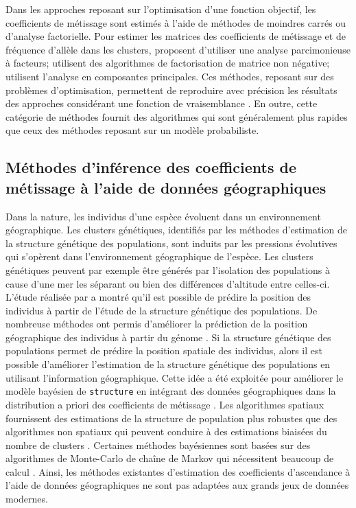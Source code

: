 \documentclass[12pt,a4paper,twoside]{ugathesis}
\begin{document}
Dans les approches reposant sur l'optimisation d'une fonction objectif, les
coefficients de métissage sont estimés à l'aide de méthodes de moindres carrés
ou d'analyse factorielle. Pour estimer les matrices des coefficients de
métissage et de fréquence d'allèle dans les clusters, \citet{Engelhardt_2010}
proposent d'utiliser une analyse parcimonieuse à facteurs; \citet{Frichot_2014}
utilisent des algorithmes de factorisation de matrice non négative;
\citet{Popescu_2014} utilisent l'analyse en composantes principales. Ces méthodes,
reposant sur des problèmes d'optimisation, permettent de reproduire avec
précision les résultats des approches considérant une fonction de vraisemblance
\citep{Frichot_2014}. En outre, cette catégorie de méthodes fournit des
algorithmes qui sont généralement plus rapides que ceux des méthodes reposant
sur un modèle probabiliste.

\subsection{Méthodes d'inférence des coefficients de métissage à l'aide de données géographiques}
\label{sec:org5369fb9}

Dans la nature, les individus d'une espèce évoluent dans un environnement
géographique. Les clusters génétiques, identifiés par les méthodes d'estimation
de la structure génétique des populations, sont induits par les pressions
évolutives qui s'opèrent dans l'environnement géographique de l'espèce. Les
clusters génétiques peuvent par exemple être générés par l'isolation des
populations à cause d'une mer les séparant ou bien des différences d'altitude
entre celles-ci. L'étude réalisée par \citet{Novembre_2008} a montré qu'il est
possible de prédire la position des individus à partir de l'étude de la
structure génétique des populations. De nombreuse méthodes ont permis
d'améliorer la prédiction de la position géographique des individus à partir du
génome \citep{Baran_2013,Yang_2012,Bhaskar_2016,Ra_ola_2014}. Si la structure
génétique des populations permet de prédire la position spatiale des individus,
alors il est possible d'améliorer l'estimation de la structure génétique des
populations en utilisant l'information géographique. Cette idée a été exploitée
pour améliorer le modèle bayésien de \texttt{structure} en intégrant des données
géographiques dans la distribution a priori des coefficients de métissage
\citep{CHEN_2007,Corander2008}. Les algorithmes spatiaux fournissent des
estimations de la structure de population plus robustes que des algorithmes non
spatiaux qui peuvent conduire à des estimations biaisées du nombre de clusters
\citep{Durand_2009}. Certaines méthodes bayésiennes sont basées sur des
algorithmes de Monte-Carlo de chaîne de Markov qui nécessitent beaucoup de
calcul \citep{FRAN_OIS_2010}. Ainsi, les méthodes existantes d'estimation des
coefficients d'ascendance à l'aide de données géographiques ne sont pas adaptées
aux grands jeux de données modernes.
\end{document}
